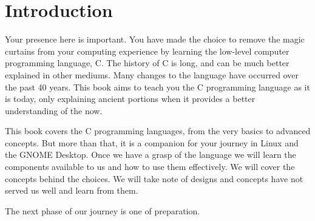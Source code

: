 \chapter{Introduction}

Your presence here is important. You have made the choice to remove the magic
curtains from your computing experience by learning the low-level computer
programming language, C. The history of C is long, and can be much better
explained in other mediums. Many changes to the language have occurred over
the past 40 years. This book aims to teach you the C programming language as
it is today, only explaining ancient portions when it provides a better
understanding of the now.

This book covers the C programming languages, from the very basics to advanced
concepts. But more than that, it is a companion for your journey in Linux and
the GNOME Desktop. Once we have a grasp of the language we will learn the
components available to us and how to use them effectively. We will cover the
concepts behind the choices. We will take note of designs and concepts have
not served us well and learn from them.

The next phase of our journey is one of preparation.
